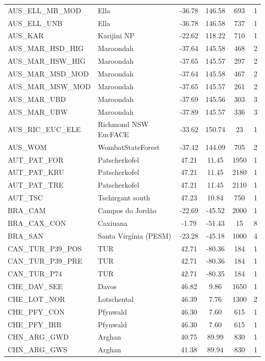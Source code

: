 \documentclass[11pt,twoside]{reedthesis}
\begin{document}
\begin{longtable}[t]{l>{\centering\arraybackslash}p{12em}cccc}
AUS\_ELL\_MB\_MOD & Ella & -36.78 & 146.58 & 693 & 1\\
AUS\_ELL\_UNB & Ella & -36.78 & 146.58 & 737 & 1\\
AUS\_KAR & Karijini NP & -22.62 & 118.22 & 710 & 1\\
AUS\_MAR\_HSD\_HIG & Maroondah & -37.64 & 145.58 & 468 & 2\\
AUS\_MAR\_HSW\_HIG & Maroondah & -37.65 & 145.57 & 297 & 2\\
AUS\_MAR\_MSD\_MOD & Maroondah & -37.64 & 145.58 & 467 & 2\\
AUS\_MAR\_MSW\_MOD & Maroondah & -37.65 & 145.57 & 261 & 2\\
AUS\_MAR\_UBD & Maroondah & -37.69 & 145.56 & 303 & 3\\
AUS\_MAR\_UBW & Maroondah & -37.89 & 145.57 & 336 & 3\\
AUS\_RIC\_EUC\_ELE & Richmond NSW EucFACE & -33.62 & 150.74 & 23 & 1\\
AUS\_WOM & WombatStateForest & -37.42 & 144.09 & 705 & 2\\
AUT\_PAT\_FOR & Patscherkofel & 47.21 & 11.45 & 1950 & 1\\
AUT\_PAT\_KRU & Patscherkofel & 47.21 & 11.45 & 2180 & 1\\
AUT\_PAT\_TRE & Patscherkofel & 47.21 & 11.45 & 2110 & 1\\
AUT\_TSC & Tschirgant south & 47.23 & 10.84 & 750 & 1\\
BRA\_CAM & Campos do Jordão & -22.69 & -45.52 & 2000 & 1\\
BRA\_CAX\_CON & Caxiuana & -1.79 & -51.43 & 15 & 8\\
BRA\_SAN & Santa Virgínia (PESM) & -23.28 & -45.18 & 1000 & 4\\
CAN\_TUR\_P39\_POS & TUR & 42.71 & -80.36 & 184 & 1\\
CAN\_TUR\_P39\_PRE & TUR & 42.71 & -80.36 & 184 & 1\\
CAN\_TUR\_P74 & TUR & 42.71 & -80.35 & 184 & 1\\
CHE\_DAV\_SEE & Davos & 46.82 & 9.86 & 1650 & 1\\
CHE\_LOT\_NOR & Lotschental & 46.39 & 7.76 & 1300 & 2\\
CHE\_PFY\_CON & Pfynwald & 46.30 & 7.60 & 615 & 1\\
CHE\_PFY\_IRR & Pfynwald & 46.30 & 7.60 & 615 & 1\\
CHN\_ARG\_GWD & Arghan & 40.75 & 89.99 & 830 & 1\\
CHN\_ARG\_GWS & Arghan & 41.38 & 89.94 & 830 & 1\\

\end{longtable}
\end{document}
